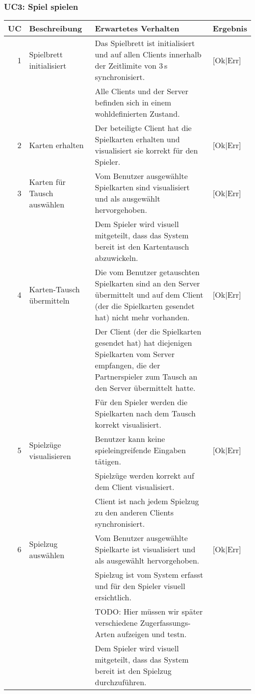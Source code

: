 \documentclass[12pt,halfparskip]{scrartcl}
\begin{document}
\subsubsection{UC3: Spiel spielen}\label{sub:uc3_spiel_spielen} %
\begin {tabular}{r | p{3cm} | p{9cm} | l}
\toprule
\textbf{UC} & \textbf{Beschreibung} & \textbf{Erwartetes Verhalten} & \textbf{Ergebnis} \\
\midrule
1 & Spielbrett initialisiert & Das Spielbrett ist initialisiert und auf allen Clients innerhalb der Zeitlimite von 3\,s synchronisiert. & [Ok|Err] \\
 \cline{3-4} & & Alle Clients und der Server befinden sich in einem wohldefinierten Zustand. & \\
\midrule
2 & Karten erhalten & Der beteiligte Client hat die Spielkarten erhalten und visualisiert sie korrekt für den Spieler. & [Ok|Err] \\
\midrule
3 & Karten für Tausch auswählen & Vom Benutzer ausgewählte Spielkarten sind visualisiert und als ausgewählt hervorgehoben. & [Ok|Err] \\
 \cline{3-4} & & Dem Spieler wird visuell mitgeteilt, dass das System bereit ist den Kartentausch abzuwickeln. & \\
\midrule
4 & Karten-Tausch übermitteln & Die vom Benutzer getauschten Spielkarten sind an den Server übermittelt und auf dem Client (der die Spielkarten gesendet hat) nicht mehr vorhanden. & [Ok|Err] \\
 \cline{3-4} & & Der Client (der die Spielkarten gesendet hat) hat diejenigen Spielkarten vom Server empfangen, die der Partnerspieler zum Tausch an den Server übermittelt hatte. & \\
 \cline{3-4} & & Für den Spieler werden die Spielkarten nach dem Tausch korrekt visualisiert. & \\
\midrule
5 & Spielzüge visualisieren & Benutzer kann keine spieleingreifende Eingaben tätigen. & [Ok|Err] \\
 \cline{3-4} & & Spielzüge werden korrekt auf dem Client visualisiert. & \\
 \cline{3-4} & & Client ist nach jedem Spielzug zu den anderen Clients synchronisiert. & \\
\midrule
6 & Spielzug auswählen & Vom Benutzer ausgewählte Spielkarte ist visualisiert und als ausgewählt hervorgehoben. & [Ok|Err] \\
 \cline{3-4} & & Spielzug ist vom System erfasst und für den Spieler visuell ersichtlich. & \\
 \cline{3-4} & & TODO: Hier müssen wir später verschiedene Zugerfassungs-Arten aufzeigen und testn. & \\
 \cline{3-4} & & Dem Spieler wird visuell mitgeteilt, dass das System bereit ist den Spielzug durchzuführen. & \\
\bottomrule
\end{tabular}
\end{document}
